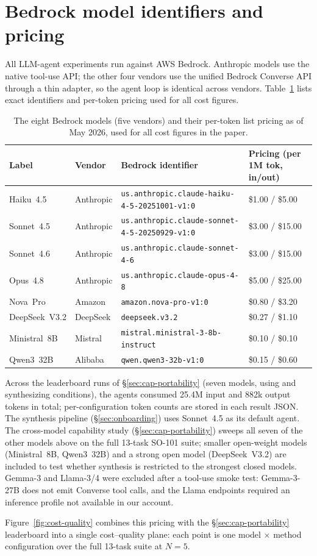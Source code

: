 \section{Bedrock model identifiers and pricing}
\label{app:models}

All LLM-agent experiments run against AWS Bedrock. Anthropic
models use the native tool-use API; the other four vendors use the
unified Bedrock Converse API through a thin adapter, so the agent
loop is identical across vendors. Table~\ref{tab:bedrock} lists
exact identifiers and per-token pricing used for all cost figures.

\begin{table}[t]
\centering
\small
\begin{tabular}{llll}
\toprule
\textbf{Label} & \textbf{Vendor} & \textbf{Bedrock identifier} & \textbf{Pricing (per 1M tok, in/out)} \\
\midrule
Haiku~4.5     & Anthropic & \texttt{us.anthropic.claude-haiku-4-5-20251001-v1:0}  & \$1.00 / \$5.00 \\
Sonnet~4.5    & Anthropic & \texttt{us.anthropic.claude-sonnet-4-5-20250929-v1:0} & \$3.00 / \$15.00 \\
Sonnet~4.6    & Anthropic & \texttt{us.anthropic.claude-sonnet-4-6}               & \$3.00 / \$15.00 \\
Opus~4.8      & Anthropic & \texttt{us.anthropic.claude-opus-4-8}                 & \$5.00 / \$25.00 \\
Nova~Pro      & Amazon    & \texttt{amazon.nova-pro-v1:0}                         & \$0.80 / \$3.20 \\
DeepSeek~V3.2 & DeepSeek  & \texttt{deepseek.v3.2}                                & \$0.27 / \$1.10 \\
Ministral~8B  & Mistral   & \texttt{mistral.ministral-3-8b-instruct}             & \$0.10 / \$0.10 \\
Qwen3~32B     & Alibaba   & \texttt{qwen.qwen3-32b-v1:0}                          & \$0.15 / \$0.60 \\
\bottomrule
\end{tabular}
\caption{The eight Bedrock models (five vendors) and their
per-token list pricing as of May 2026, used for all cost figures in
the paper.}
\label{tab:bedrock}
\end{table}

Across the leaderboard runs of
\S\ref{sec:cap-portability} (seven models, using and synthesizing
conditions), the agents consumed 25.4M input and 882k output tokens in total;
per-configuration token counts are stored in each result JSON.
The synthesis pipeline (\S\ref{sec:onboarding}) uses Sonnet~4.5 as
its default agent. The cross-model capability study
(\S\ref{sec:cap-portability}) sweeps all seven of the other models
above on the full 13-task SO-101 suite; smaller open-weight models
(Ministral~8B, Qwen3~32B) and a strong open model (DeepSeek~V3.2)
are included to test whether synthesis is restricted to the
strongest closed models.
Gemma-3 and Llama-3/4 were excluded after a tool-use smoke test:
Gemma-3-27B does not emit Converse tool calls, and the Llama
endpoints required an inference profile not available in our
account.

Figure~\ref{fig:cost-quality} combines this pricing with the
\S\ref{sec:cap-portability} leaderboard into a single cost--quality
plane: each point is one model $\times$ method configuration over
the full 13-task suite at $N{=}5$.


